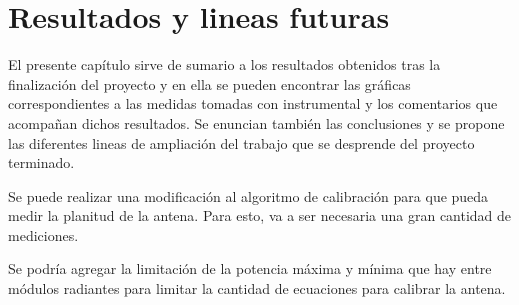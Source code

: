 \chapter{Resultados y lineas futuras}

El presente capítulo sirve de sumario a los resultados obtenidos tras la finalización del proyecto y en ella se pueden encontrar
las gráficas correspondientes a las medidas tomadas con instrumental y los comentarios que acompañan dichos resultados. Se enuncian
también las conclusiones y se propone las diferentes lineas de ampliación del trabajo que se desprende del proyecto terminado.

Se puede realizar una modificación al algoritmo de calibración para que pueda medir la planitud de la antena. Para esto, va a ser
necesaria una gran cantidad de mediciones.

Se podría agregar la limitación de la potencia máxima y mínima que hay entre módulos radiantes para limitar la cantidad de 
ecuaciones para calibrar la antena.
